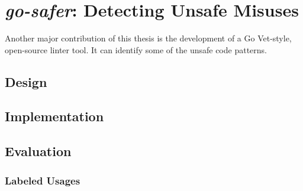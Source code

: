 
\chapter{\textit{go-safer}: Detecting Unsafe Misuses}\label{ch:go-safer}

Another major contribution of this thesis is the development of a Go Vet-style, open-source linter tool.
It can identify some of the unsafe code patterns.





\section{Design}\label{sec:go-safer:design}






\section{Implementation}\label{sec:go-safer:implementation}




\section{Evaluation}\label{sec:go-safer:evaluation}



\subsection{Labeled Usages}\label{subsec:go-safer:evaluation:labeled-usages}

